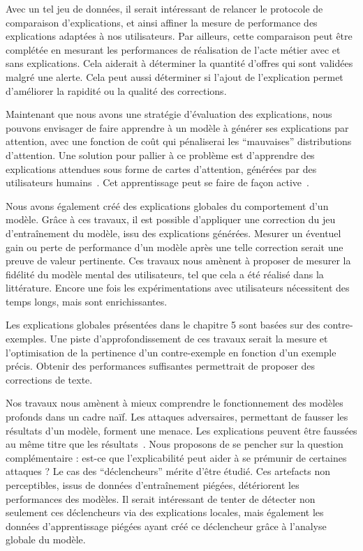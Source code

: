 Avec un tel jeu de données, il serait intéressant de relancer le protocole de comparaison d'explications, et ainsi affiner la mesure de performance des explications adaptées à nos utilisateurs.
Par ailleurs, cette comparaison peut être complétée en mesurant les performances de réalisation de l'acte métier avec et sans explications. Cela aiderait à déterminer la quantité d'offres qui sont validées malgré une alerte. Cela peut aussi déterminer si l'ajout de l'explication permet d'améliorer la rapidité ou la qualité des corrections.

Maintenant que nous avons une stratégie d'évaluation des explications, nous pouvons envisager de faire apprendre à un modèle à générer ses explications par attention, avec une fonction de coût qui pénaliserai les ``mauvaises'' distributions d'attention. Une solution pour pallier à ce problème est d'apprendre des explications attendues sous forme de cartes d'attention, générées par des utilisateurs humains~\cite{Bao2018}. Cet apprentissage peut se faire de façon active~\cite{Teso2019}.

Nous avons également créé des explications globales du comportement d'un modèle. Grâce à ces travaux, il est possible d'appliquer une correction du jeu d'entraînement du modèle, issu des explications générées. Mesurer un éventuel gain ou perte de performance d'un modèle après une telle correction serait une preuve de valeur pertinente.
Ces travaux nous amènent à proposer de mesurer la fidélité du modèle mental des utilisateurs, tel que cela a été réalisé dans la littérature. Encore une fois les expérimentations avec utilisateurs nécessitent des temps longs, mais sont enrichissantes. %

Les explications globales présentées dans le chapitre 5 sont basées sur des contre-exemples. Une piste d'approfondissement de ces travaux serait la mesure et l'optimisation de la pertinence d'un contre-exemple en fonction d'un exemple précis. Obtenir des performances suffisantes permettrait de proposer des corrections de texte.

Nos travaux nous amènent à mieux comprendre le fonctionnement des modèles profonds dans un cadre naïf. Les attaques adversaires, permettant de fausser les résultats d'un modèle, forment une menace. Les explications peuvent être faussées au même titre que les résultats~\cite{Dombrowski2019}.
Nous proposons de se pencher sur la question complémentaire : est-ce que l'explicabilité peut aider à se prémunir de certaines attaques ? Le cas des ``déclencheurs'' mérite d'être étudié. Ces artefacts non perceptibles, issus de données d'entraînement piégées, détériorent les performances des modèles. Il serait intéressant de tenter de détecter non seulement ces déclencheurs via des explications locales, mais également les données d'apprentissage piégées ayant créé ce déclencheur grâce à l'analyse globale du modèle.

